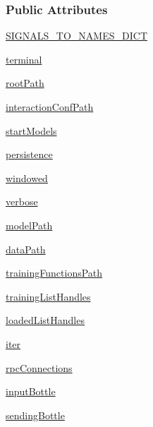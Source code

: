 \subsubsection*{Public Attributes}
\begin{DoxyCompactItemize}
\item 
\hyperlink{group__icubclient__SAM__Core_a4f67b5cb9734e4a0701b7f9504a61ed3}{S\+I\+G\+N\+A\+L\+S\+\_\+\+T\+O\+\_\+\+N\+A\+M\+E\+S\+\_\+\+D\+I\+CT}
\item 
\hyperlink{group__icubclient__SAM__Core_a67a88ad0dc0f28594ca09e2d7c6e49ec}{terminal}
\item 
\hyperlink{group__icubclient__SAM__Core_a07b5eeb3fdbfc8d30117d43c38aa447f}{root\+Path}
\item 
\hyperlink{group__icubclient__SAM__Core_a9b571281241e3ee8a694100c0f1df63e}{interaction\+Conf\+Path}
\item 
\hyperlink{group__icubclient__SAM__Core_a5b19f0fa63dacfcff2e085c77e520574}{start\+Models}
\item 
\hyperlink{group__icubclient__SAM__Core_aa3f1f237f2eb531cef144f2021e2ac42}{persistence}
\item 
\hyperlink{group__icubclient__SAM__Core_a88f83731ee76871ab0ea6bbc3d39898a}{windowed}
\item 
\hyperlink{group__icubclient__SAM__Core_aafb40c5e7cbf693ac38ae5a23de9ba14}{verbose}
\item 
\hyperlink{group__icubclient__SAM__Core_ae46bfc58f34cff74d2a7152a58e42bd7}{model\+Path}
\item 
\hyperlink{group__icubclient__SAM__Core_a80c501dcf41f3b0e292bc389b89615f6}{data\+Path}
\item 
\hyperlink{group__icubclient__SAM__Core_a8c16720da4c800ce7a46bc3bd19ca052}{training\+Functions\+Path}
\item 
\hyperlink{group__icubclient__SAM__Core_a6fc8b2e9fecbf11f5c2bc1cc9825c0fc}{training\+List\+Handles}
\item 
\hyperlink{group__icubclient__SAM__Core_a682b822323ead85badfc9a39f5239ca6}{loaded\+List\+Handles}
\item 
\hyperlink{group__icubclient__SAM__Core_a797f9b4850068143650d0fcb85e7f722}{iter}
\item 
\hyperlink{group__icubclient__SAM__Core_a96999ec4bcf0ddcff4354cadcd80e719}{rpc\+Connections}
\item 
\hyperlink{group__icubclient__SAM__Core_acbb80f74ed2d34b2dd249dcc9014fcbe}{input\+Bottle}
\item 
\hyperlink{group__icubclient__SAM__Core_a1423f8dc69acbc067f768ce4082c5502}{sending\+Bottle}

\end{DoxyCompactItemize}
